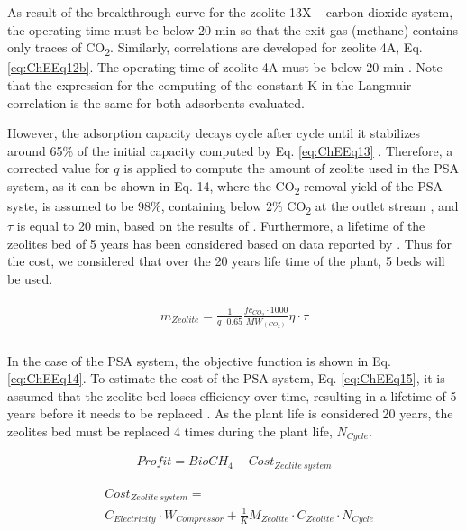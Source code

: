 \begin{refsection}[referencesCh7]
As result of the breakthrough curve for the zeolite 13X – carbon dioxide system, the operating time must be below 20 min so that the exit gas (methane) contains only traces of CO\textsubscript{2}. Similarly, correlations are developed for zeolite 4A, Eq. \ref{eq:ChEEq12b}. The operating time of zeolite 4A must be below 20 min \citep{hauchhum2014carbon}. Note that the expression for the computing of the constant K in the Langmuir correlation is the same for both adsorbents evaluated.

However, the adsorption capacity decays cycle after cycle until it stabilizes around 65\% of the initial capacity computed by Eq. \ref{eq:ChEEq13} \citep{hauchhum2014carbon}. Therefore, a corrected value for $q$ is applied to compute the amount of zeolite used in the PSA system, as it can be shown in Eq. 14, where the CO\textsubscript{2} removal yield of the PSA syste, is assumed to be 98\%, containing below 2\% CO\textsubscript{2} at the outlet stream \citep{ferella2017separation}, and $\tau$ is equal to 20 min, based on the results of \citet{hauchhum2014carbon}. Furthermore, a lifetime of the zeolites bed of 5 years has been considered based on data reported by \citet{Xiao2013}. Thus for the cost, we considered that over the 20 years life time of the plant, 5 beds will be used.

\begin{align}
\begin{array}{l}{m_{Zeolite}} = \frac{1}{{q\cdot0.65}}\frac{{f{c_{C{O_2}}}\cdot1000}}{{M{W_{(C{O_2})}}}}\eta \cdot\tau \\\end{array} \label{eq:ChEEq13}
\end{align}

In the case of the PSA system, the objective function is shown in Eq. \ref{eq:ChEEq14}. To estimate the cost of the PSA system, Eq. \ref{eq:ChEEq15}, it is assumed that the zeolite bed loses efficiency over time, resulting in a lifetime of 5 years before it needs to be replaced \citep{Xiao2013}. As the plant life is considered 20 years, the zeolites bed must be replaced 4 times during the plant life, $N_{Cycle}$. 

\begin{align}
Profit = BioCH_{4} - Cost_{Zeolite \ system} \label{eq:ChEEq14}
\end{align}

\begin{align}
&Cost_{Zeolite \ system} = \label{eq:ChEEq15}\\
&C_{Electricity} \cdot W_{Compressor} + \frac{1}{K}{M_{Zeolite}} \cdot {C_{Zeolite}}\cdot{N_{Cycle}} \nonumber
\end{align}


\end{refsection}
